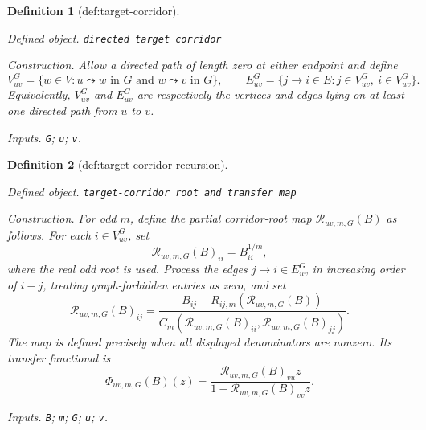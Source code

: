 \documentclass{article}
\newtheorem{definition}{Definition}
\begin{document}
\begin{definition}[def:target-corridor]\label{def:target-corridor}
\par\smallskip\noindent\emph{Defined object.} \texttt{directed target corridor}
\par\smallskip\noindent\emph{Construction.} Allow a directed path of length zero at either endpoint and define
\[
 V_{uv}^{G}
 =\{w\in V:u\leadsto w\text{ in }G\text{ and }w\leadsto v\text{ in }G\},
 \qquad
 E_{uv}^{G}
 =\{j\to i\in E:j\in V_{uv}^{G},\ i\in V_{uv}^{G}\}.
\]
Equivalently, \(V_{uv}^{G}\) and \(E_{uv}^{G}\) are respectively the vertices and edges lying on at least one directed path from \(u\) to \(v\).
\par\smallskip\noindent\emph{Inputs.} \texttt{G}; \texttt{u}; \texttt{v}.
\end{definition}

\begin{definition}[def:target-corridor-recursion]\label{def:target-corridor-recursion}
\par\smallskip\noindent\emph{Defined object.} \texttt{target-\allowbreak{}corridor root and transfer map}
\par\smallskip\noindent\emph{Construction.} For odd \(m\), define the partial corridor-root map \(\mathscr R_{uv,m,G}(B)\) as follows.  For each \(i\in V_{uv}^{G}\), set
\[
 \mathscr R_{uv,m,G}(B)_{ii}=B_{ii}^{1/m},
\]
where the real odd root is used.  Process the edges \(j\to i\in E_{uv}^{G}\) in increasing order of \(i-j\), treating graph-forbidden entries as zero, and set
\[
 \mathscr R_{uv,m,G}(B)_{ij}
 =\frac{B_{ij}-R_{ij,m}(\mathscr R_{uv,m,G}(B))}
 {C_m(\mathscr R_{uv,m,G}(B)_{ii},\mathscr R_{uv,m,G}(B)_{jj})}.
\]
The map is defined precisely when all displayed denominators are nonzero.  Its transfer functional is
\[
 \Phi_{uv,m,G}(B)(z)
 =\frac{\mathscr R_{uv,m,G}(B)_{vu}z}
 {1-\mathscr R_{uv,m,G}(B)_{vv}z}.
\]
\par\smallskip\noindent\emph{Inputs.} \texttt{B}; \texttt{m}; \texttt{G}; \texttt{u}; \texttt{v}.
\end{definition}
\end{document}
